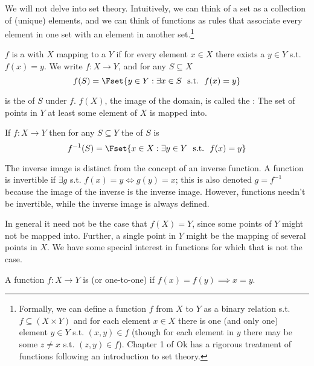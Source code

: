 \documentclass{article}
\begin{document}
We will not delve into set theory. Intuitively, we can think of a set as a collection of (unique) elements, and we can think of functions as rules that associate every element in one set with an element in another set.\footnote{Formally, we can define a function $f$ from $X$ to $Y$ as a binary relation s.t. $f \subseteq (X \times Y)$ and for each element $x \in X$ there is one (and only one) element $y \in Y$ s.t. $(x, y) \in f$ (though for each element in $y$ there may be some $z \ne x$ s.t. $(z, y) \in f$). Chapter 1 of Ok has a rigorous treatment of functions following an introduction to set theory.}
\begin{definition}[function]\label{def:lecture1_functions}
  $f$ is a  with  $X$ mapping to a  $Y$ if for every element $x \in X$ there exists a $y \in Y$ s.t. $f(x) = y$. We write $f: X \to Y$, and for any $S \subseteq X$
\[
  f(S) = \Fset{y \in Y: \exists x \in S ~~\text{s.t.}~~ f(x) = y}
\]

  is the  of $S$ under $f$. $f(X)$, the image of the domain, is called the : The set of points in $Y$ at least some element of $X$ is mapped into.
\end{definition}

\begin{definition}\label{def:lecture1_inverse_image}
  If $f: X \to Y$ then for any $S \subseteq Y$ the  of $S$ is
  \[
    f^{-1}(S) = \Fset{
      x \in X: \exists y \in Y ~~\text{s.t.}~~ f(x) = y
    }
  \]
\end{definition}

\begin{remark}
  The inverse image is distinct from the concept of an inverse function. A function is invertible if $\exists g$ s.t. $f(x) = y \iff g(y) = x$; this is also denoted $g = f^{-1}$ because the image of the inverse is the inverse image. However, functions needn't be invertible, while the inverse image is always defined.
\end{remark}

In general it need not be the case that $f(X) = Y$, since some points of $Y$ might not be mapped into. Further, a single point in $Y$ might be the mapping of several points in $X$. We have some special interest in functions for which that is not the case.
\begin{definition}[injective]\label{def:lecture1_injective}
  A function $f: X \to Y$ is  (or one-to-one) if $f(x) = f(y) \implies x = y$.
\end{definition}
\end{document}
